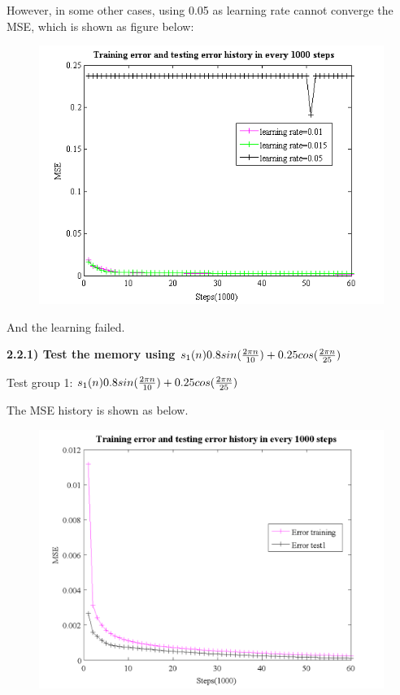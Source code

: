 \documentclass[epsfig]{article}
\def\bpar{\vskip26pt}
\def\npar{\vskip13pt}
\begin{document}
However, in some other cases, using 0.05 as learning rate cannot converge the MSE, which is shown as figure below:

\begin{figure}[H] 
\centering\includegraphics[width=4.5in]{lr_err2.png} 
\end{figure} 

And the learning failed.



{\bf 
\npar
2.2.1) Test the memory using $s_1{(n)}0.8sin({2\pi n \over 10}) + 0.25cos({2\pi n \over 25})$

\bpar
}

Test group 1: $s_1{(n)}0.8sin({2\pi n \over 10}) + 0.25cos({2\pi n \over 25})$

The MSE history is shown as below.

\begin{figure}[H] 
\centering\includegraphics[width=4.5in]{err_test1.png} 
\end{figure} 
\end{document}
